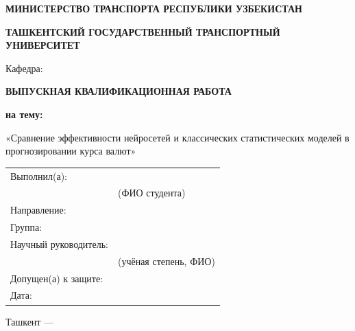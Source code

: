 \begin{titlepage}
\begin{center}

\textbf{МИНИСТЕРСТВО ТРАНСПОРТА РЕСПУБЛИКИ УЗБЕКИСТАН}

\vspace{0.3cm}
\textbf{ТАШКЕНТСКИЙ ГОСУДАРСТВЕННЫЙ ТРАНСПОРТНЫЙ УНИВЕРСИТЕТ}

\vspace{0.3cm}
Кафедра: \underline{\hspace{6cm}}

\vfill

{\large\bfseries ВЫПУСКНАЯ КВАЛИФИКАЦИОННАЯ РАБОТА}

\vspace{0.5cm}
{\large\bfseries на тему:}

\vspace{0.3cm}
{\large «Сравнение эффективности нейросетей и классических статистических моделей в прогнозировании курса валют»}

\vfill

\begin{flushright}
\begin{tabular}{ll}
Выполнил(а): & \underline{\hspace{5cm}} \\[6pt]
             & (ФИО студента) \\[12pt]
Направление: & \underline{\hspace{5cm}} \\[6pt]
Группа:      & \underline{\hspace{5cm}} \\[24pt]
Научный руководитель: & \underline{\hspace{5cm}} \\[6pt]
              & (учёная степень, ФИО) \\[12pt]
Допущен(а) к защите: & \underline{\hspace{5cm}} \\[6pt]
Дата: & \underline{\hspace{5cm}} \\
\end{tabular}
\end{flushright}

\vfill

{\large Ташкент --- \the\year}

\end{center}
\end{titlepage}
\setcounter{page}{2}
